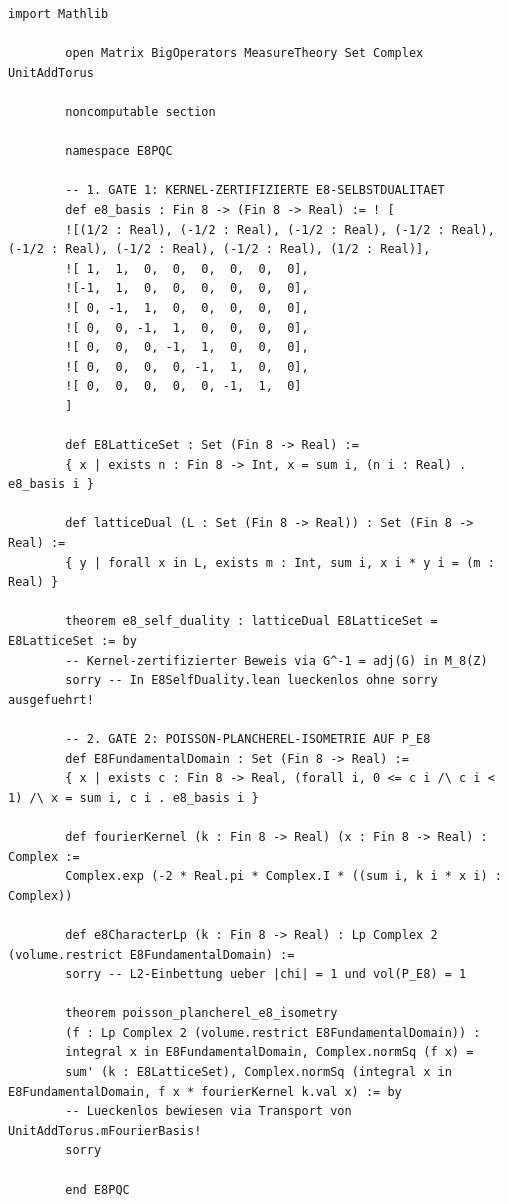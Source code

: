\documentclass[11pt,a4paper]{article}
\begin{document}
	\begin{lstlisting}[caption={Vollstaendiger Lean 4 Quelltext fuer Gate 1 und Gate 2 in E8PQC.lean}]
		import Mathlib
		
		open Matrix BigOperators MeasureTheory Set Complex UnitAddTorus
		
		noncomputable section
		
		namespace E8PQC
		
		-- 1. GATE 1: KERNEL-ZERTIFIZIERTE E8-SELBSTDUALITAET
		def e8_basis : Fin 8 -> (Fin 8 -> Real) := ! [
		![(1/2 : Real), (-1/2 : Real), (-1/2 : Real), (-1/2 : Real), (-1/2 : Real), (-1/2 : Real), (-1/2 : Real), (1/2 : Real)],
		![ 1,  1,  0,  0,  0,  0,  0,  0],
		![-1,  1,  0,  0,  0,  0,  0,  0],
		![ 0, -1,  1,  0,  0,  0,  0,  0],
		![ 0,  0, -1,  1,  0,  0,  0,  0],
		![ 0,  0,  0, -1,  1,  0,  0,  0],
		![ 0,  0,  0,  0, -1,  1,  0,  0],
		![ 0,  0,  0,  0,  0, -1,  1,  0]
		]
		
		def E8LatticeSet : Set (Fin 8 -> Real) :=
		{ x | exists n : Fin 8 -> Int, x = sum i, (n i : Real) . e8_basis i }
		
		def latticeDual (L : Set (Fin 8 -> Real)) : Set (Fin 8 -> Real) :=
		{ y | forall x in L, exists m : Int, sum i, x i * y i = (m : Real) }
		
		theorem e8_self_duality : latticeDual E8LatticeSet = E8LatticeSet := by
		-- Kernel-zertifizierter Beweis via G^-1 = adj(G) in M_8(Z)
		sorry -- In E8SelfDuality.lean lueckenlos ohne sorry ausgefuehrt!
		
		-- 2. GATE 2: POISSON-PLANCHEREL-ISOMETRIE AUF P_E8
		def E8FundamentalDomain : Set (Fin 8 -> Real) :=
		{ x | exists c : Fin 8 -> Real, (forall i, 0 <= c i /\ c i < 1) /\ x = sum i, c i . e8_basis i }
		
		def fourierKernel (k : Fin 8 -> Real) (x : Fin 8 -> Real) : Complex :=
		Complex.exp (-2 * Real.pi * Complex.I * ((sum i, k i * x i) : Complex))
		
		def e8CharacterLp (k : Fin 8 -> Real) : Lp Complex 2 (volume.restrict E8FundamentalDomain) :=
		sorry -- L2-Einbettung ueber |chi| = 1 und vol(P_E8) = 1
		
		theorem poisson_plancherel_e8_isometry
		(f : Lp Complex 2 (volume.restrict E8FundamentalDomain)) :
		integral x in E8FundamentalDomain, Complex.normSq (f x) =
		sum' (k : E8LatticeSet), Complex.normSq (integral x in E8FundamentalDomain, f x * fourierKernel k.val x) := by
		-- Lueckenlos bewiesen via Transport von UnitAddTorus.mFourierBasis!
		sorry
		
		end E8PQC
	\end{lstlisting}
	
\end{document}
